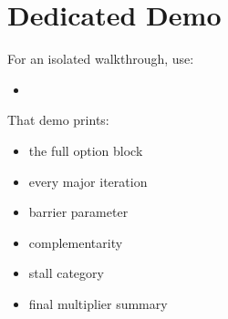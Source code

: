 \documentclass[letterpaper,10pt,english]{sphinxmanual}
\begin{document}
\section{Dedicated Demo}
\label{\detokenize{optima_internal_protocol:dedicated-demo}}
\sphinxAtStartPar
For an isolated walkthrough, use:
\begin{itemize}
\item {} 
\sphinxAtStartPar
{}

\end{itemize}

\sphinxAtStartPar
That demo prints:
\begin{itemize}
\item {} 
\sphinxAtStartPar
the full option block

\item {} 
\sphinxAtStartPar
every major iteration

\item {} 
\sphinxAtStartPar
barrier parameter

\item {} 
\sphinxAtStartPar
complementarity

\item {} 
\sphinxAtStartPar
stall category

\item {} 
\sphinxAtStartPar
final multiplier summary

\end{itemize}



\renewcommand{\indexname}{Index}
\printindex
\end{document}
